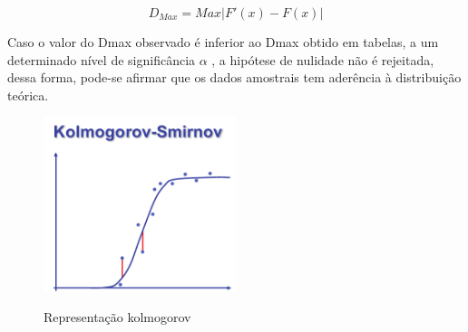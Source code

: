 \begin{equation}
\label{eq:kolmogorov}
    D_{Max} = Max|F'(x) - F(x)|
\end{equation}

Caso o valor do Dmax observado é inferior ao Dmax obtido em tabelas, a um determinado nível de significância $\alpha$ , a hipótese de nulidade não é rejeitada, dessa forma, pode-se afirmar que os dados amostrais tem aderência à distribuição teórica.

\begin{figure}[h]
    \caption{Representação kolmogorov}
    \centering
    \includegraphics[width=0.5\textwidth]{Textuais/Figuras/kolmogorov.pdf}
    \label{fig:kolmogorov}
\end{figure}